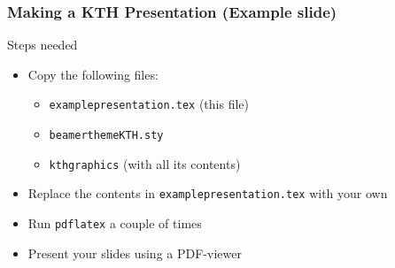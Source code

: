 \documentclass[aspectratio=1610]{beamer}
\begin{document}
\begin{frame}
  \frametitle{\hfill Making a KTH Presentation (Example slide)}

  \begin{block}{Steps needed}
    \begin{itemize}
    \item Copy the following files:
    \begin{itemize}
    \item \texttt{examplepresentation.tex} (this file)
    \item \texttt{beamerthemeKTH.sty}
    \item \texttt{kthgraphics} (with all its contents)
    \end{itemize}
    \item Replace the contents in \texttt{examplepresentation.tex} with your own
    \item Run \texttt{pdflatex} a couple of times
    \item Present your slides using a PDF-viewer
    \end{itemize}
  \end{block}

\end{frame}
\end{document}
